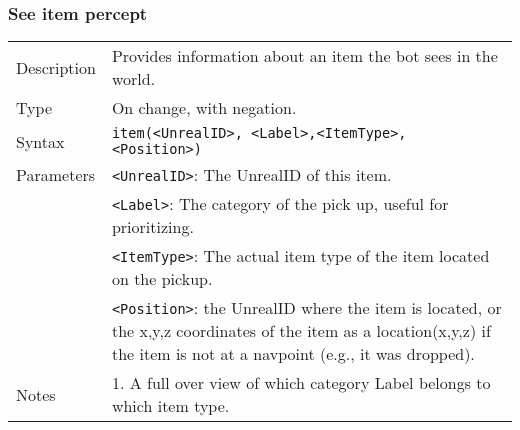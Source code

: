 \documentclass[11pt,a4paper]{article}
\begin{document}
\subsubsection*{See item percept}
\begin{small}
\begin{tabular}{p{2cm}p{9cm}}
Description & Provides information about an item the bot sees in the world.\\
Type & On change, with negation.\\
Syntax & \verb|item(<UnrealID>, <Label>,<ItemType>, <Position>)|\\ 
Parameters &
\verb|<UnrealID>|: The UnrealID of this item.\\
& \verb|<Label>|: The category of the pick up, useful for prioritizing.\\
& \verb|<ItemType>|: The actual item type of the item located on the pickup. \\
& \verb|<Position>|: the UnrealID where the item is located, or the x,y,z coordinates of the item as a location(x,y,z) if the item is not at a navpoint (e.g., it was dropped).\\
Notes &
	1.	A full over view of which category Label belongs to which item type.
\end{tabular}
\end{small}
\\\\
\end{document}
